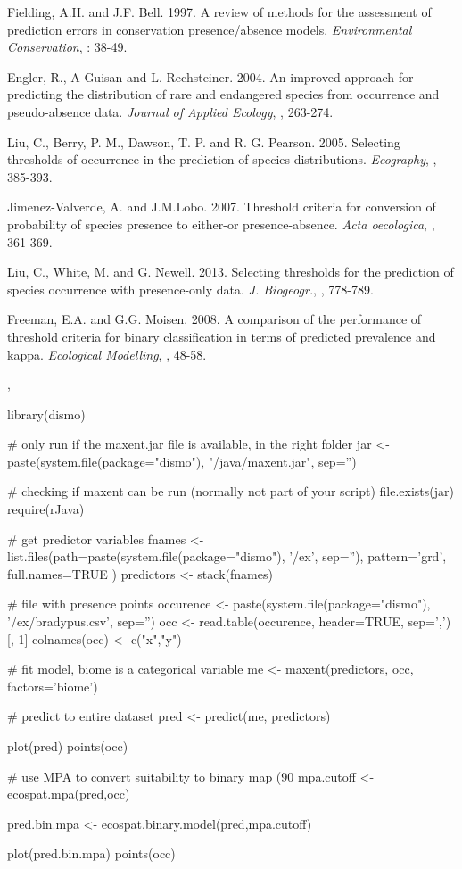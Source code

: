 \documentclass[a4paper]{book}
\begin{document}
\begin{References}\relax
Fielding, A.H. and J.F. Bell. 1997. A review of methods for the assessment of prediction errors in conservation presence/absence models. \emph{Environmental Conservation}, : 38-49.

Engler, R., A Guisan and L. Rechsteiner. 2004. An improved approach for predicting the distribution of rare and endangered species from occurrence and pseudo-absence data. \emph{Journal of Applied Ecology}, , 263-274.

Liu, C., Berry, P. M., Dawson, T. P. and R. G. Pearson. 2005. Selecting thresholds of occurrence in the prediction of species distributions. \emph{Ecography}, , 385-393.

Jimenez-Valverde, A. and J.M.Lobo. 2007. Threshold criteria for conversion of probability of species presence to either-or presence-absence. \emph{Acta oecologica}, , 361-369.

Liu, C., White, M. and G. Newell. 2013. Selecting thresholds for the prediction of species occurrence with presence-only data. \emph{J. Biogeogr.}, , 778-789.

Freeman, E.A. and G.G. Moisen. 2008. A comparison of the performance of threshold criteria for binary classification in terms of predicted prevalence and kappa. \emph{Ecological Modelling}, , 48-58.
\end{References}
%
\begin{SeeAlso}\relax
{}, 
\end{SeeAlso}
%
\begin{Examples}
\begin{ExampleCode}
library(dismo)


# only run if the maxent.jar file is available, in the right folder
jar <- paste(system.file(package="dismo"), "/java/maxent.jar", sep='')

# checking if maxent can be run (normally not part of your script)
file.exists(jar)
require(rJava)

# get predictor variables
fnames <- list.files(path=paste(system.file(package="dismo"), '/ex', sep=''), 
                     pattern='grd', full.names=TRUE )
predictors <- stack(fnames)


# file with presence points
occurence <- paste(system.file(package="dismo"), '/ex/bradypus.csv', sep='')
occ <- read.table(occurence, header=TRUE, sep=',')[,-1]
colnames(occ) <- c("x","y")

# fit model, biome is a categorical variable
me <- maxent(predictors, occ, factors='biome')

# predict to entire dataset
pred <- predict(me, predictors) 

plot(pred)
points(occ)


# use MPA to convert suitability to binary map (90%
mpa.cutoff <- ecospat.mpa(pred,occ)

pred.bin.mpa <- ecospat.binary.model(pred,mpa.cutoff)

plot(pred.bin.mpa)
points(occ)
\end{ExampleCode}
\end{Examples}
\end{document}
